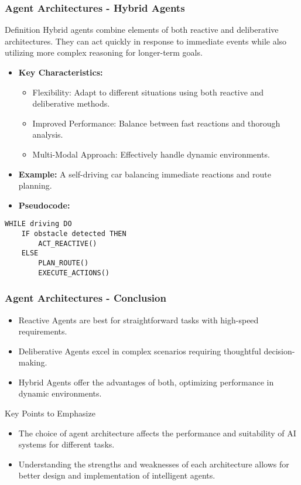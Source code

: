 \documentclass[aspectratio=169]{beamer}
\begin{document}
\begin{frame}[fragile]
  \frametitle{Agent Architectures - Hybrid Agents}
  \begin{block}{Definition}
    Hybrid agents combine elements of both reactive and deliberative architectures. They can act quickly in response to immediate events while also utilizing more complex reasoning for longer-term goals.
  \end{block}
  \begin{itemize}
    \item \textbf{Key Characteristics:}
      \begin{itemize}
        \item Flexibility: Adapt to different situations using both reactive and deliberative methods.
        \item Improved Performance: Balance between fast reactions and thorough analysis.
        \item Multi-Modal Approach: Effectively handle dynamic environments.
      \end{itemize}
    \item \textbf{Example:} A self-driving car balancing immediate reactions and route planning.
    \item \textbf{Pseudocode:}
  \end{itemize}
  \begin{lstlisting}
WHILE driving DO
    IF obstacle detected THEN
        ACT_REACTIVE()
    ELSE
        PLAN_ROUTE()
        EXECUTE_ACTIONS()
\end{lstlisting}
\end{frame}

\begin{frame}[fragile]
  \frametitle{Agent Architectures - Conclusion}
  \begin{itemize}
    \item Reactive Agents are best for straightforward tasks with high-speed requirements.
    \item Deliberative Agents excel in complex scenarios requiring thoughtful decision-making.
    \item Hybrid Agents offer the advantages of both, optimizing performance in dynamic environments.
  \end{itemize}
  \begin{block}{Key Points to Emphasize}
    \begin{itemize}
      \item The choice of agent architecture affects the performance and suitability of AI systems for different tasks.
      \item Understanding the strengths and weaknesses of each architecture allows for better design and implementation of intelligent agents.
    \end{itemize}
  \end{block}
\end{frame}
\end{document}
